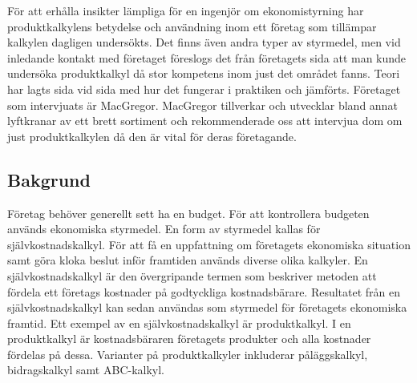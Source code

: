 För att erhålla insikter lämpliga för en ingenjör om ekonomistyrning har produktkalkylens betydelse och användning inom ett företag som tillämpar kalkylen dagligen undersökts.
Det finns även andra typer av styrmedel, men vid inledande kontakt med företaget föreslogs det från företagets sida att man kunde undersöka produktkalkyl då stor kompetens inom just det området fanns.
Teori har lagts sida vid sida med hur det fungerar i praktiken och jämförts.
Företaget som intervjuats är MacGregor.
MacGregor tillverkar och utvecklar bland annat lyftkranar av ett brett sortiment och rekommenderade oss att intervjua dom om just produktkalkylen då den är vital för deras företagande.



%
%


%
%

\subsection{Bakgrund} 
Företag behöver generellt sett ha en budget.
För att kontrollera budgeten används ekonomiska styrmedel.
En form av styrmedel kallas för självkostnadskalkyl.
För att få en uppfattning om företagets ekonomiska situation samt göra kloka beslut inför framtiden används diverse olika kalkyler.
En självkostnadskalkyl är den övergripande termen som beskriver metoden att fördela ett företags kostnader på godtyckliga kostnadsbärare.
Resultatet från en självkostnadskalkyl kan sedan användas som styrmedel för företagets ekonomiska framtid.
Ett exempel av en självkostnadskalkyl är produktkalkyl.
I en produktkalkyl är kostnadsbäraren företagets produkter och alla kostnader fördelas på dessa.
Varianter på produktkalkyler inkluderar påläggskalkyl, bidragskalkyl samt ABC-kalkyl. \cite{dne}

